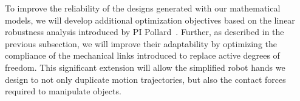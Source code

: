 To improve the reliability of the designs generated with our mathematical models, we will develop additional optimization objectives based on the linear robustness analysis introduced by PI Pollard~\cite{Pollard:WAFR02,pollard2004closure,pollard20045}. Further, as described in the previous subsection, we will improve their adaptability by optimizing the compliance of the mechanical links introduced to replace active degrees of freedom. This significant extension will allow the simplified robot hands we design to not only duplicate motion trajectories, but also the contact forces required to manipulate objects.





%


